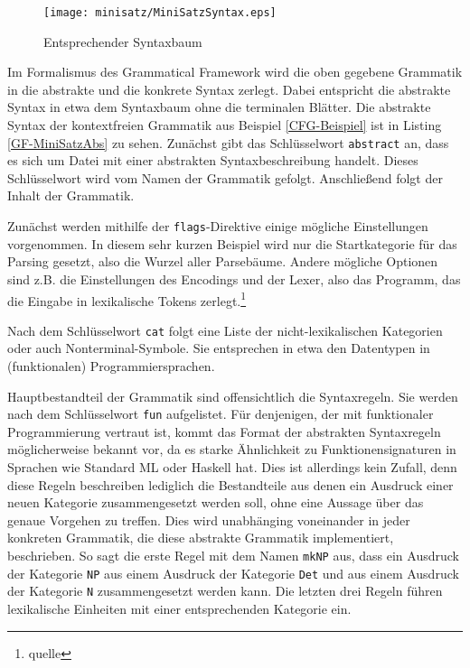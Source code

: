 \documentclass[12pt,abstract=on]{scrreprt}
\begin{document}
\begin{figure}[h]
\texttt{[image: minisatz/MiniSatzSyntax.eps]}
\caption{Entsprechender Syntaxbaum}\label{CFG-Syntaxbaum}
\end{figure}
Im Formalismus des Grammatical Framework wird die oben gegebene Grammatik in die abstrakte und die konkrete Syntax zerlegt.
Dabei entspricht die abstrakte Syntax in etwa dem Syntaxbaum ohne die terminalen Blätter. Die abstrakte Syntax der kontextfreien Grammatik aus Beispiel \ref{CFG-Beispiel} ist in Listing \ref{GF-MiniSatzAbs} zu sehen. Zunächst gibt das Schlüsselwort \texttt{abstract} an, dass es sich um Datei mit einer abstrakten Syntaxbeschreibung handelt. Dieses Schlüsselwort wird vom Namen der Grammatik gefolgt. Anschließend folgt der Inhalt der Grammatik. \par
Zunächst werden mithilfe der \texttt{flags}-Direktive einige mögliche Einstellungen vorgenommen. In diesem sehr kurzen Beispiel wird nur die Startkategorie für das Parsing gesetzt, also die Wurzel aller Parsebäume. Andere mögliche Optionen sind z.B. die Einstellungen des Encodings und der Lexer, also das Programm, das die Eingabe in lexikalische Tokens zerlegt.\footnote{quelle} \par
Nach dem Schlüsselwort \texttt{cat} folgt eine Liste der nicht-lexikalischen Kategorien oder auch Nonterminal-Symbole. Sie entsprechen in etwa den Datentypen in (funktionalen) Programmiersprachen. \par
Hauptbestandteil der Grammatik sind offensichtlich die Syntaxregeln. Sie werden nach dem Schlüsselwort \texttt{fun} aufgelistet. Für denjenigen, der mit funktionaler Programmierung vertraut ist, kommt das Format der abstrakten Syntaxregeln möglicherweise bekannt vor, da es starke Ähnlichkeit zu Funktionensignaturen in Sprachen wie Standard ML oder Haskell hat. Dies ist allerdings kein Zufall, denn diese Regeln beschreiben lediglich die Bestandteile aus denen ein Ausdruck einer neuen Kategorie zusammengesetzt werden soll, ohne eine Aussage über das genaue Vorgehen zu treffen. Dies wird unabhänging voneinander in jeder konkreten Grammatik, die diese abstrakte Grammatik implementiert, beschrieben. So sagt die erste Regel mit dem Namen \texttt{mkNP} aus, dass ein Ausdruck der Kategorie \texttt{NP} aus einem Ausdruck der Kategorie \texttt{Det} und aus einem Ausdruck der Kategorie \texttt{N} zusammengesetzt werden kann. Die letzten drei Regeln führen lexikalische Einheiten mit einer entsprechenden Kategorie ein. \par
\end{document}

